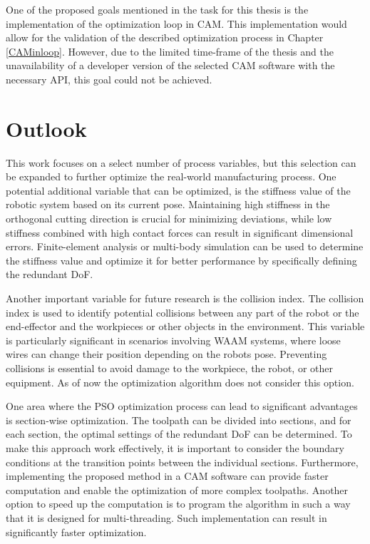 One of the proposed goals mentioned in the task for this thesis is the implementation of the optimization loop in \acrshort{CAM}. This implementation would allow for the validation of the described optimization process in Chapter \ref{CAMinloop}. However, due to the limited time-frame of the thesis and the unavailability of a developer version of the selected \acrshort{CAM} software with the necessary \acrshort{API}, this goal could not be achieved.


\section{Outlook}\label{Outlook}

This work focuses on a select number of process variables, but this selection can be expanded to further optimize the real-world manufacturing process. One potential additional variable that can be optimized, is the stiffness value of the robotic system based on its current pose. Maintaining high stiffness in the orthogonal cutting direction is crucial for minimizing deviations, while low stiffness combined with high contact forces can result in significant dimensional errors. Finite-element analysis or multi-body simulation can be used to determine the stiffness value and optimize it for better performance by specifically defining the redundant \acrshort{DoF}.

Another important variable for future research is the collision index. The collision index is used to identify potential collisions between any part of the robot or the end-effector and the workpieces or other objects in the environment. This variable is particularly significant in scenarios involving \acrshort{WAAM} systems, where loose wires can change their position depending on the robots pose. Preventing collisions is essential to avoid damage to the workpiece, the robot, or other equipment. As of now the optimization algorithm does not consider this option.

One area where the \acrshort{PSO} optimization process can lead to significant advantages is section-wise optimization. The toolpath can be divided into sections, and for each section, the optimal settings of the redundant \acrshort{DoF} can be determined. To make this approach work effectively, it is important to consider the boundary conditions at the transition points between the individual sections.
Furthermore, implementing the proposed method in a \acrshort{CAM} software can provide faster computation and enable the optimization of more complex toolpaths. Another option to speed up the computation is to program the algorithm in such a way that it is designed for multi-threading. Such implementation can result in significantly faster optimization.  

